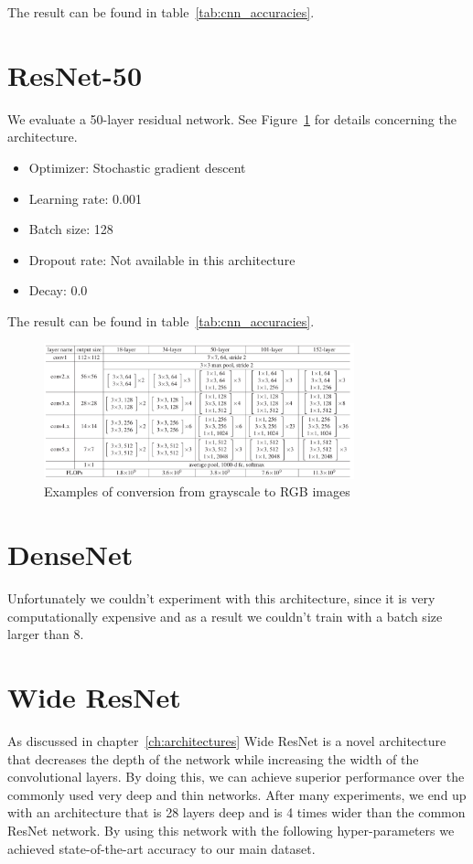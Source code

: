 The result can be found in table~\ref{tab:cnn_accuracies}.

\section{ResNet-50}
We evaluate a 50-layer residual network. See Figure~\ref{fig:resnets.png} for details concerning the architecture.

\begin{itemize}
  \item Optimizer: Stochastic gradient descent
  \item Learning rate: 0.001
  \item Batch size: 128
  \item Dropout rate: Not available in this architecture
  \item Decay: 0.0
\end{itemize}

The result can be found in table~\ref{tab:cnn_accuracies}.

\begin{figure}[]
    \begin{center}
    \includegraphics[width=0.8\textwidth]{images/resnets.png}
    \end{center}
    \caption{Examples of conversion from grayscale to RGB images} \label{fig:resnets.png}
\end{figure}


\section{DenseNet}
Unfortunately we couldn't experiment with this architecture, since it is very computationally expensive and as a result we couldn't train with a batch size larger than 8.

\section{Wide ResNet}
As discussed in chapter~\ref{ch:architectures} Wide ResNet is a novel architecture that decreases the depth of the network while increasing the width of the convolutional layers. By doing this, we can achieve superior performance over the commonly used very deep and thin networks. After many experiments, we end up with an architecture that is 28 layers deep and is 4 times wider than the common ResNet network. By using this network with the following hyper-parameters we achieved state-of-the-art accuracy to our main dataset.

